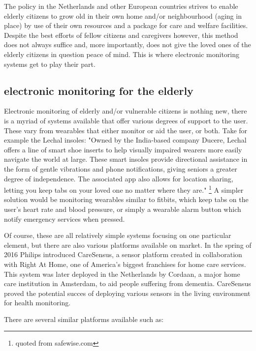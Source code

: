 \documentclass{below-ext}
\begin{document}
The policy in the Netherlands and other European countries strives to enable elderly citizens to grow old in their own home and/or neighbourhood (aging in place) by use of their own resources and a package for care and welfare facilities. \cite{thomas_blanchard} Despite the best efforts of fellow citizens and caregivers however, this method does not always suffice and, more importantly, does not give the loved ones of the elderly citizens in question peace of mind. This is where electronic monitoring systems get to play their part.


\subsection{electronic monitoring for the elderly}
Electronic monitoring of elderly and/or vulnerable citizens is nothing new, there is a myriad of systems available that offer various degrees of support to the user. These vary from wearables that either monitor or aid the user, or both. Take for example the Lechal insoles: "Owned by the India-based company Ducere, Lechal offers a line of smart shoe inserts to help visually impaired wearers more easily navigate the world at large. These smart insoles provide directional assistance in the form of gentle vibrations and phone notifications, giving seniors a greater degree of independence. The associated app also allows for location sharing, letting you keep tabs on your loved one no matter where they are." \footnote{quoted from safewise.com} A simpler solution would be monitoring wearables similar to fitbits, which keep tabs on the user's heart rate and blood pressure, or simply a wearable alarm button which notify emergency services when pressed.

Of course, these are all relatively simple systems focusing on one particular element, but there are also various platforms available on market. In the spring of 2016 Philips introduced CareSensus, a sensor platform created in collaboration with Right At Home, one of America's biggest franchises for  home care services. This system was later deployed in the Netherlands by Cordaan, a major home care institution in Amsterdam, to aid people suffering from dementia. CareSensus proved the potential succes of deploying various sensors in the living environment for health monitoring.

There are several similar platforms available such as:
\end{document}
